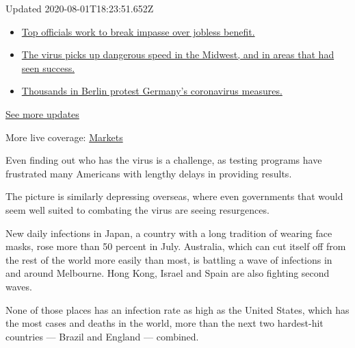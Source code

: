 Updated 2020-08-01T18:23:51.652Z

\begin{itemize}
\tightlist
\item
  \href{https://www.nytimes.com/2020/08/01/world/coronavirus-covid-19.html?action=click\&pgtype=Article\&state=default\&region=MAIN_CONTENT_1\&context=storylines_live_updates\#link-3ac56579}{Top
  officials work to break impasse over jobless benefit.}
\item
  \href{https://www.nytimes.com/2020/08/01/world/coronavirus-covid-19.html?action=click\&pgtype=Article\&state=default\&region=MAIN_CONTENT_1\&context=storylines_live_updates\#link-8796723}{The
  virus picks up dangerous speed in the Midwest, and in areas that had
  seen success.}
\item
  \href{https://www.nytimes.com/2020/08/01/world/coronavirus-covid-19.html?action=click\&pgtype=Article\&state=default\&region=MAIN_CONTENT_1\&context=storylines_live_updates\#link-25930521}{Thousands
  in Berlin protest Germany's coronavirus measures.}
\end{itemize}

\href{https://www.nytimes.com/2020/08/01/world/coronavirus-covid-19.html?action=click\&pgtype=Article\&state=default\&region=MAIN_CONTENT_1\&context=storylines_live_updates}{See
more updates}

More live coverage:
\href{https://www.nytimes.com/live/2020/07/31/business/stock-market-today-coronavirus?action=click\&pgtype=Article\&state=default\&region=MAIN_CONTENT_1\&context=storylines_live_updates}{Markets}

Even finding out who has the virus is a challenge, as testing programs
have frustrated many Americans with lengthy delays in providing results.

The picture is similarly depressing overseas, where even governments
that would seem well suited to combating the virus are seeing
resurgences.

New daily infections in Japan, a country with a long tradition of
wearing face masks, rose more than 50 percent in July. Australia, which
can cut itself off from the rest of the world more easily than most, is
battling a wave of infections in and around Melbourne. Hong Kong, Israel
and Spain are also fighting second waves.

None of those places has an infection rate as high as the United States,
which has the most cases and deaths in the world, more than the next two
hardest-hit countries --- Brazil and England --- combined.

